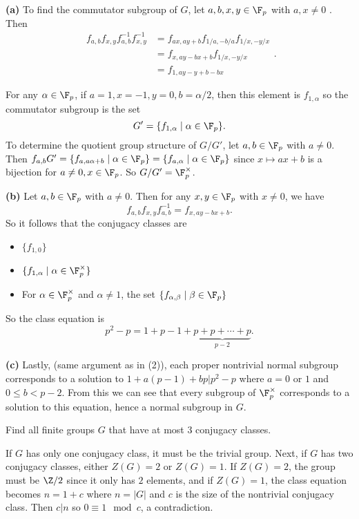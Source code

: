 \documentclass[11pt,letterpaper]{article}
\begin{document}
\textbf{(a)} To find the commutator subgroup of $G$, let $a,b,x,y\in \F_p$ with $a,x\neq 0$ . Then
\[
  \begin{aligned}
    f_{a,b}f_{x,y}f_{a,b}^{-1}f_{x,y}^{-1}&=f_{ax,ay+b}f_{1/a,-b/a}f_{1/x,-y/x}\\
    &= f_{x,ay-bx+b}f_{1/x,-y/x}\\
    &= f_{1, ay-y+b-bx}
  \end{aligned}
.\]

For any $\alpha\in \F_p$, if $a=1, x=-1, y=0, b=\alpha/2$, then this element is $f_{1,\alpha}$ so the commutator subgroup is the set 
\[
  G'=\{f_{1,\alpha}\mid \alpha\in \F_p\}
.\] 
To determine the quotient group structure of $G/G'$, let $a,b\in \F_p$ with $a\neq 0$. Then $f_{a,b}G'=\{f_{a,a\alpha+b} \mid \alpha\in \F_p\}=\{f_{a,\alpha}\mid \alpha\in \F_p\}$ since $x\mapsto ax+b$ is a bijection for $a\neq 0, x\in \F_p$. So $G/G'=\F^\times_p$.

\textbf{(b)} Let $a,b\in \F_p$ with $a\neq 0$. Then for any $x,y\in \F_p$ with $x\neq 0$, we have 
\[
  f_{a,b}f_{x,y}f_{a,b}^{-1}=f_{x,ay-bx+b}
.\]
So it follows that the conjugacy classes are
\begin{itemize}
  \item $\{f_{1,0}\}$
  \item $\{f_{1,\alpha} \mid \alpha\in \F_p^\times\}$
  \item For $\alpha\in \F_p^\times$ and $\alpha\neq 1$, the set $\{f_{\alpha, \beta}\mid \beta\in\F_p\}$  
\end{itemize} 
So the class equation is
\[
  p^2-p = 1 + p-1 + \underbrace{p+p+\cdots+p}_{p-2}
.\] 

\textbf{(c)} Lastly, (same argument as in (2)), each proper nontrivial normal subgroup corresponds to a solution to $1+a(p-1)+bp|p^2-p$ where $a=0$ or $1$ and $0\leq b < p-2$. From this we can see that every subgroup of $\F_p^\times$ corresponds to a solution to this equation, hence a normal subgroup in $G$.     

\pagebreak
\begin{problem}
Find all finite groups $G$ that have at most 3 conjugacy classes.
\end{problem}

If $G$ has only one conjugacy class, it must be the trivial group. Next, if $G$ has two conjugacy classes, either $Z(G)=2$ or $Z(G)=1$. If $Z(G)=2$, the group must be $\Z/2$ since it only has $2$ elements, and if $Z(G)=1$, the class equation becomes $n=1+c$ where $n=|G|$ and $c$ is the size of the nontrivial conjugacy class. Then $c|n$ so $0\equiv 1\mod c$, a contradiction.           
\end{document}
